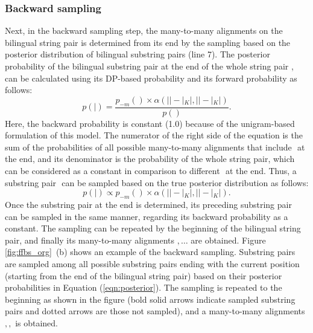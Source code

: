 \documentclass[english]{jnlp_1.4}
\def\pair#1#2{}
\def\subpair#1#2{}
\newcommand{\svec}[1]{}
\begin{document}
\subsubsection{Backward sampling}

Next, in the backward sampling step,
the many-to-many alignments on the bilingual string pair is determined from its end
by the sampling based on the posterior distribution of bilingual substring pairs (line 7).
The posterior probability of the bilingual substring pair at the end of the whole string pair {$\subpair{\svec{\sigma}_{K}}{\svec{\tau}_{K}}$},
can be calculated using its DP-based probability and its forward probability as follows:
\begin{equation}
p (\subpair{\svec{\sigma}_{K}}{\svec{\tau}_{K}} \mid \pair{\svec{s}}{\svec{t}}) = 
 \frac{p_{-m} (\subpair{\svec{\sigma}_{K}}{\svec{\tau}_{K}}) \times \alpha (|\svec{s}| - |\svec{\sigma}_{K}|, |\svec{t}| - |\svec{\tau}_{K}|)}{p (\pair{\svec{s}}{\svec{t}})}.
\end{equation}
Here, the backward probability is constant (1.0) because of the unigram-based formulation of this model.
The numerator of the right side of the equation is the sum of the probabilities of all possible many-to-many alignments that include
{$\subpair{\svec{\sigma}_{K}}{\svec{\tau}_{K}}$} at the end,
and its denominator is the probability of the whole string pair, which can be considered as a constant
in comparison to different {$\subpair{\svec{\sigma}_{K}}{\svec{\tau}_{K}}$} at the end.
Thus, a substring pair {$\subpair{\svec{\sigma}_{K}}{\svec{\tau}_{K}}$} can be sampled
based on the true posterior distribution as follows:
\begin{equation}
p (\subpair{\svec{\sigma}_{K}}{\svec{\tau}_{K}} \mid \pair{\svec{s}}{\svec{t}}) \propto p_{-m} (\subpair{\svec{\sigma}_{K}}{\svec{\tau}_{K}}) \times \alpha (|\svec{s}| - |\svec{\sigma}_{K}|, |\svec{t}| - |\svec{\tau}_{K}|).
\label{eqn:posterior}
\end{equation}
Once the substring pair at the end is determined,
its preceding substring pair {$\subpair{\svec{\sigma}_{K-1}}{\svec{\tau}_{K-1}}$} can be sampled in the same manner,
regarding its backward probability as a constant.
The sampling can be repeated by the beginning of the bilingual string pair,
and finally its many-to-many alignments
{$\pair{\svec{\sigma}_{1}}{\svec{\tau}_{1}}, \ldots \pair{\svec{\sigma}_{K}}{\svec{\tau}_{K}}$} are obtained.
Figure {\ref{fig:ffbs_org}}~(b) shows an example of the backward sampling.
Substring pairs are sampled among all possible substring pairs ending with the current position (starting from the end of the bilingual string pair)
based on their posterior probabilities in Equation ({\ref{eqn:posterior}}).
The sampling is repeated to the beginning as shown in the figure
(bold solid arrows indicate sampled substring pairs and dotted arrows are those not sampled),
and a many-to-many alignments {$\subpair{\text{カ}}{\text{co}}, \subpair{\text{バ}}{\text{v}}, \subpair{\text{ー}}{\text{er}}$} is obtained.
\end{document}
